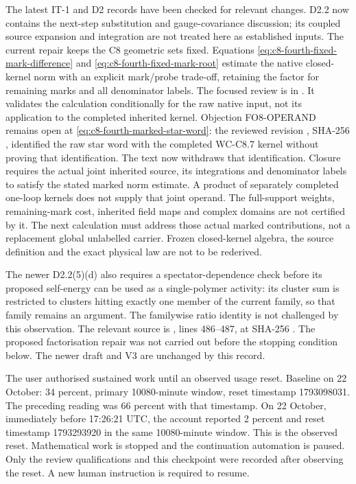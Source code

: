 \documentclass[11pt]{article}
\begin{document}
The latest IT-1 and D2 records have been checked for relevant
changes. D2.2 now contains the next-step substitution and
gauge-covariance discussion; its coupled source expansion
and integration are not treated here as established inputs.
The current repair keeps the C8 geometric sets fixed.
Equations \eqref{eq:c8-fourth-fixed-mark-difference} and
\eqref{eq:c8-fourth-fixed-mark-root} estimate the native
closed-kernel norm with an explicit mark/probe trade-off,
retaining the factor for remaining marks and all denominator
labels. The focused review is in .
It validates the calculation conditionally for the raw native
input, not its application to the completed inherited kernel.
Objection FO8-OPERAND remains open at
\eqref{eq:c8-fourth-marked-star-word}: the reviewed revision
, SHA-256
,
identified the raw star word with the completed WC-C8.7
kernel without proving that identification. The text now
withdraws that identification. Closure requires the actual
joint inherited source, its integrations and denominator
labels to satisfy the stated marked norm estimate. A product
of separately completed one-loop kernels does not supply
that joint operand.
The full-support weights, remaining-mark cost, inherited
field maps and complex domains are not certified by it.
The next calculation must address those actual marked
contributions, not a replacement global unlabelled carrier.
Frozen closed-kernel algebra,
the source definition and the exact physical law are not
to be rederived.

The newer D2.2(5)(d) also requires a spectator-dependence
check before its proposed self-energy can be used as a
single-polymer activity: its cluster sum is restricted to
clusters hitting exactly one member of the current family,
so that family remains an argument. The familywise ratio
identity is not challenged by this observation. The relevant
source is ,
lines 486--487, at SHA-256
.
The proposed factorisation repair was not carried out before
the stopping condition below. The newer draft and V3 are
unchanged by this record.

The user authorised sustained work until an observed usage
reset. Baseline on 22 October: 34 percent, primary
10080-minute window, reset timestamp 1793098031.
The preceding reading was 66 percent with that timestamp.
On 22 October, immediately before 17:26:21 UTC, the account
reported 2 percent and reset timestamp 1793293920 in the
same 10080-minute window. This is the observed reset.
Mathematical work is stopped and the continuation automation
is paused. Only the review qualifications and this checkpoint
were recorded after observing the reset. A new human
instruction is required to resume.
\end{document}
